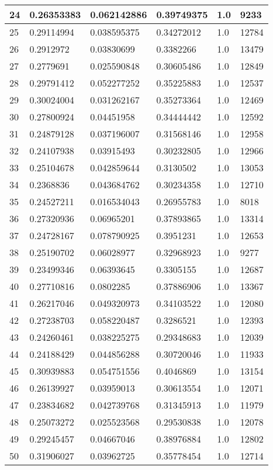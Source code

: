 \begin{longtable}{|l|l|l|l|l|l|}
24 & 0.26353383 & 0.062142886 & 0.39749375 & 1.0 & 9233 \\ \hline 
25 & 0.29114994 & 0.038595375 & 0.34272012 & 1.0 & 12784 \\ \hline 
26 & 0.2912972 & 0.03830699 & 0.3382266 & 1.0 & 13479 \\ \hline 
27 & 0.2779691 & 0.025590848 & 0.30605486 & 1.0 & 12849 \\ \hline 
28 & 0.29791412 & 0.052277252 & 0.35225883 & 1.0 & 12537 \\ \hline 
29 & 0.30024004 & 0.031262167 & 0.35273364 & 1.0 & 12469 \\ \hline 
30 & 0.27800924 & 0.04451958 & 0.34444442 & 1.0 & 12592 \\ \hline 
31 & 0.24879128 & 0.037196007 & 0.31568146 & 1.0 & 12958 \\ \hline 
32 & 0.24107938 & 0.03915493 & 0.30232805 & 1.0 & 12966 \\ \hline 
33 & 0.25104678 & 0.042859644 & 0.3130502 & 1.0 & 13053 \\ \hline 
34 & 0.2368836 & 0.043684762 & 0.30234358 & 1.0 & 12710 \\ \hline 
35 & 0.24527211 & 0.016534043 & 0.26955783 & 1.0 & 8018 \\ \hline 
36 & 0.27320936 & 0.06965201 & 0.37893865 & 1.0 & 13314 \\ \hline 
37 & 0.24728167 & 0.078790925 & 0.3951231 & 1.0 & 12653 \\ \hline 
38 & 0.25190702 & 0.06028977 & 0.32968923 & 1.0 & 9277 \\ \hline 
39 & 0.23499346 & 0.06393645 & 0.3305155 & 1.0 & 12687 \\ \hline 
40 & 0.27710816 & 0.0802285 & 0.37886906 & 1.0 & 13367 \\ \hline 
41 & 0.26217046 & 0.049320973 & 0.34103522 & 1.0 & 12080 \\ \hline 
42 & 0.27238703 & 0.058220487 & 0.3286521 & 1.0 & 12393 \\ \hline 
43 & 0.24260461 & 0.038225275 & 0.29348683 & 1.0 & 12039 \\ \hline 
44 & 0.24188429 & 0.044856288 & 0.30720046 & 1.0 & 11933 \\ \hline 
45 & 0.30939883 & 0.054751556 & 0.4046869 & 1.0 & 13154 \\ \hline 
46 & 0.26139927 & 0.03959013 & 0.30613554 & 1.0 & 12071 \\ \hline 
47 & 0.23834682 & 0.042739768 & 0.31345913 & 1.0 & 11979 \\ \hline 
48 & 0.25073272 & 0.025523568 & 0.29530838 & 1.0 & 12078 \\ \hline 
49 & 0.29245457 & 0.04667046 & 0.38976884 & 1.0 & 12802 \\ \hline 
50 & 0.31906027 & 0.03962725 & 0.35778454 & 1.0 & 12714 \\ \hline 
\end{longtable}